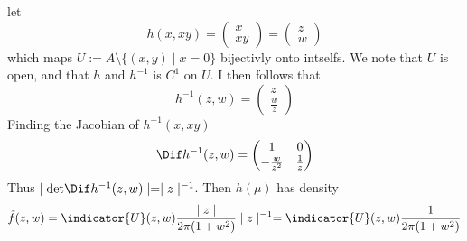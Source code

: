 \begin{solution}
let
\[
	h(x,xy)=
	\begin{pmatrix}
	x \\ xy
	\end{pmatrix}
	=
	\begin{pmatrix}
	z \\
	w
	\end{pmatrix}
\]
which maps \(U:=A\setminus\{(x,y)\mid x=0\}\) bijectivly onto intselfs. We note that \(U\) is open, and that \(h\) and \(h^{-1}\) is \(C^1\) on \(U\).  I then follows that
\[
	h^{-1}(z,w) =
	\begin{pmatrix}
	z \\
	\frac{w}{z}
	\end{pmatrix}
\]
Finding the Jacobian of \(h^{-1}(x,xy)\)
\[
	\Dif h^{-1}(z,w)=
	\begin{pmatrix}
	1 & 0 \\
	-\frac{w}{z^2} & \frac{1}{z}
	\end{pmatrix}
\]
 Thus \(\mid \mathrm{det}\Dif h^{-1}(z,w)\mid=\mid z\mid^{-1}\). Then \(h(\mu)\) has density
 \[
 	\tilde{f}(z,w)=\indicator{U}(z,w)\frac{\mid z\mid}{2\pi(1+w^2)}\mid z\mid^{-1}=\indicator{U}(z,w)\frac{1}{2\pi(1+w^2)}
 \]
\end{solution}
